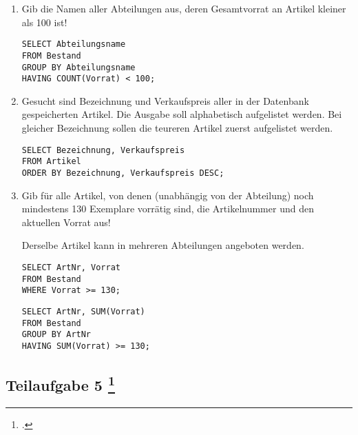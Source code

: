 \documentclass{lehramt-informatik-aufgabe}
\begin{document}
\begin{enumerate}

\item Gib die Namen aller Abteilungen aus, deren Gesamtvorrat an Artikel
kleiner als 100 ist!

\begin{antwort}[muster]
\begin{verbatim}
SELECT Abteilungsname
FROM Bestand
GROUP BY Abteilungsname
HAVING COUNT(Vorrat) < 100;
\end{verbatim}
\end{antwort}


\item Gesucht sind Bezeichnung und Verkaufspreis aller in der Datenbank
gespeicherten Artikel. Die Ausgabe soll alphabetisch aufgelistet werden.
Bei gleicher Bezeichnung sollen die teureren Artikel zuerst aufgelistet
werden.

\begin{antwort}[muster]
\begin{verbatim}
SELECT Bezeichnung, Verkaufspreis
FROM Artikel
ORDER BY Bezeichnung, Verkaufspreis DESC;
\end{verbatim}
\end{antwort}


\item Gib für alle Artikel, von denen (unabhängig von der Abteilung)
noch mindestens 130 Exemplare vorrätig sind, die Artikelnummer und den
aktuellen Vorrat aus!

\begin{antwort}[falsch]
Derselbe Artikel kann in mehreren Abteilungen angeboten werden.
\begin{verbatim}
SELECT ArtNr, Vorrat
FROM Bestand
WHERE Vorrat >= 130;
\end{verbatim}
\end{antwort}

\begin{antwort}[muster]
\begin{verbatim}
SELECT ArtNr, SUM(Vorrat)
FROM Bestand
GROUP BY ArtNr
HAVING SUM(Vorrat) >= 130;
\end{verbatim}
\end{antwort}
\end{enumerate}

%

\subsection{Teilaufgabe 5
\footcite[Aufgabe 3: Kaufhaus zum letzten Mal!]{db:ab:7}}
\end{document}
